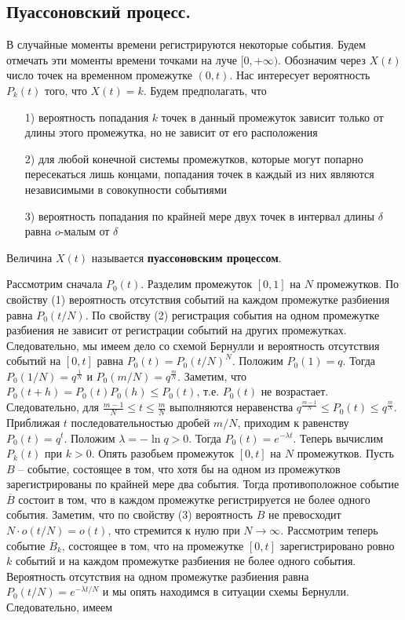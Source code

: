 \subsection{Пуассоновский процесс.}
В случайные моменты времени регистрируются некоторые события. Будем отмечать эти моменты времени точками на луче $[0, +\infty)$. Обозначим через $X(t)$ число точек на временном промежутке $(0, t)$. Нас интересует вероятность $P_k(t)$ того, что $X(t) = k$. Будем предполагать, что
\begin{enumerate}
    \item[1)] вероятность попадания $k$ точек в данный промежуток зависит только от длины этого промежутка, но не зависит от его расположения
    \item[2)] для любой конечной системы промежутков, которые могут попарно пересекаться лишь концами, попадания точек в каждый из них являются независимыми в совокупности событиями
    \item[3)] вероятность попадания по крайней мере двух точек в интервал длины $\delta$ равна $o$-малым от $\delta$
\end{enumerate}
\begin{definition}
    Величина $X(t)$ называется \textbf{пуассоновским процессом}.
\end{definition}
Рассмотрим сначала $P_0(t)$. Разделим промежуток $[0,1]$ на $N$ промежутков. По свойству (1) вероятность отсутствия событий на каждом промежутке разбиения равна $P_0(t/N)$. По свойству (2) регистрация события на одном промежутке разбиения не зависит от регистрации событий на других промежутках. Следовательно, мы имеем дело со схемой Бернулли и вероятность отсутствия событий на $[0, t]$ равна $P_0(t) = P_0(t/N)^N$. Положим $P_0(1) = q$. Тогда $P_0(1/N) = q^{\frac{1}{N}}$ и $P_0(m/N) = q^{\frac{m}{N}}$. Заметим, что $P_0(t + h) = P_0(t)P_0(h) \leqslant P_0(t)$, т.е. $P_0(t)$ не возрастает. Следовательно, для $\frac{m-1}{N} \leqslant t \leqslant \frac{m}{N}$ выполняются неравенства $q^{\frac{m-1}{N}} \leqslant P_0(t) \leqslant q^{\frac{m}{N}}$. Приближая $t$ последовательностью дробей $m/N$, приходим к равенству $P_0(t) = q^t$. Положим $\lambda = - \ln{q} > 0$. Тогда $P_0(t) = e^{- \lambda t}$.
\newline
Теперь вычислим $P_k(t)$ при $k > 0$. Опять разобьем промежуток $[0, t]$ на $N$ промежутков. Пусть $B$ -- событие, состоящее в том, что хотя бы на одном из промежутков зарегистрированы по крайней мере два события. Тогда противоположное событие $\overline{B}$ состоит в том, что в каждом промежутке регистрируется не более одного события. Заметим, что по свойству (3) вероятность $B$ не превосходит $N \cdot o(t/N) = o(t)$, что стремится к нулю при $N \to \infty$. Рассмотрим теперь событие $\overline{B}_k$, состоящее в том, что на промежутке $[0, t]$ зарегистрировано ровно $k$ событий и на каждом промежутке разбиения не более одного события. Вероятность отсутствия на одном промежутке разбиения равна $P_0(t/N) = e^{-\lambda t / N}$ и мы опять находимся в ситуации схемы Бернулли. Следовательно, имеем

